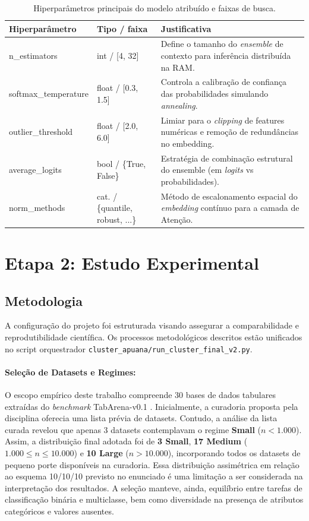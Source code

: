 \documentclass[12pt,a4paper]{article}
\begin{document}
\begin{table}[htbp]
\centering
\caption{Hiperparâmetros principais do modelo atribuído e faixas de busca.}
\label{tab:hiperparametros}
\vspace{0.2cm}
\begin{tabular}{llp{7cm}}
\toprule
\textbf{Hiperparâmetro} & \textbf{Tipo / faixa} & \textbf{Justificativa} \\ \midrule
n\_estimators & int / [4, 32] & Define o tamanho do \textit{ensemble} de contexto para inferência distribuída na RAM. \\
softmax\_temperature & float / [0.3, 1.5] & Controla a calibração de confiança das probabilidades simulando \textit{annealing}. \\
outlier\_threshold & float / [2.0, 6.0] & Limiar para o \textit{clipping} de features numéricas e remoção de redundâncias no embedding. \\
average\_logits & bool / \{True, False\} & Estratégia de combinação estrutural do ensemble (em \textit{logits} vs probabilidades). \\
norm\_methods & cat. / \{quantile, robust, ...\} & Método de escalonamento espacial do \textit{embedding} contínuo para a camada de Atenção. \\ \bottomrule
\end{tabular}
\end{table}

\section*{Etapa 2: Estudo Experimental}

\subsection{Metodologia}
A configuração do projeto foi estruturada visando assegurar a comparabilidade e reprodutibilidade científica. Os processos metodológicos descritos estão unificados no script orquestrador \texttt{cluster\_apuana/run\_cluster\_final\_v2.py}.

\paragraph{Seleção de Datasets e Regimes:} O escopo empírico deste trabalho compreende 30 bases de dados tabulares extraídas do \textit{benchmark} TabArena-v0.1 \cite{tabarena2025}. Inicialmente, a curadoria proposta pela disciplina oferecia uma lista prévia de datasets. Contudo, a análise da lista curada revelou que apenas 3 datasets contemplavam o regime \textbf{Small} ($n < 1.000$). Assim, a distribuição final adotada foi de \textbf{3 Small}, \textbf{17 Medium} ($1.000 \leq n \leq 10.000$) e \textbf{10 Large} ($n > 10.000$), incorporando todos os datasets de pequeno porte disponíveis na curadoria. Essa distribuição assimétrica em relação ao esquema 10/10/10 previsto no enunciado é uma limitação a ser considerada na interpretação dos resultados. A seleção manteve, ainda, equilíbrio entre tarefas de classificação binária e multiclasse, bem como diversidade na presença de atributos categóricos e valores ausentes.
\end{document}

